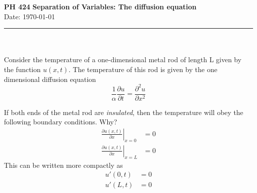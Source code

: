 \documentclass[a4paper, 11pt]{article}
\begin{document}
\noindent
\large\textbf{PH 424} \hfill \textbf{Separation of
  Variables: The diffusion equation} \\
 \hfill  Date: \today \\
\par\noindent\rule{\textwidth}{0.4pt} \\\\


\noindent Consider the temperature of a one-dimensional metal rod of length L
given by the function $u(x,t)$. The temperature of this rod is given by the one
dimensional diffusion equation
\begin{equation}
  \frac{1}{\alpha}\frac{\partial u}{\partial t} = \frac{\partial^2 u}{\partial x^2}
\end{equation}

\noindent If both ends of the metal rod are \textit{insulated}, then the temperature will
obey the following boundary conditions.  Why?
\begin{align}
  \left. \frac{\partial u(x,t)}{\partial{x}} \right\vert_{x=0} &= 0 \\
  \left. \frac{\partial u(x,t)}{\partial{x}} \right\vert_{x=L} &= 0
\end{align}
This can be written more compactly as
\begin{align}
  u'(0,t) &= 0  \\
  u'(L, t) &= 0 
\end{align}
\end{document}
